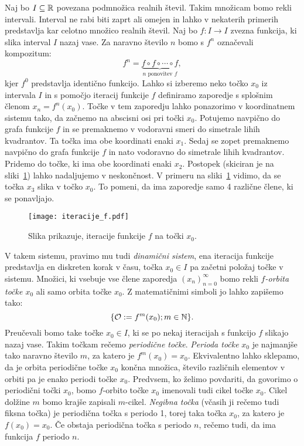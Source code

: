 \documentclass[../TG_magistrsko_delo_sections.tex]{subfiles}
\begin{document}
Naj bo $I\subseteq \mathbb R$ povezana podmnožica realnih števil. Takim množicam bomo rekli intervali. Interval ne rabi biti zaprt ali omejen in lahko v nekaterih primerih predstavlja kar celotno množico realnih števil. Naj bo $f:I \to I$ zvezna funkcija, ki slika interval $I$ nazaj vase. Za naravno število $n$ bomo s $f^n$ označevali kompozitum:
$$f^n = \underbrace{f \circ f \circ \cdots \circ f}_{n \text{ ponovitev } f},$$
kjer $f^0$ predstavlja identično funkcijo. Lahko si izberemo neko točko $x_0$ iz intervala $I$ in s pomočjo iteracij funkcije $f$ definiramo zaporedje s splošnim členom $x_n = f^n(x_0)$. Točke v tem zaporedju lahko ponazorimo v koordinatnem sistemu tako, da začnemo na abscisni osi pri točki $x_0$. Potujemo navpično do grafa funkcije $f$ in se premaknemo v vodoravni smeri do simetrale lihih kvadrantov. Ta točka ima obe koordinati enaki $x_1$. Sedaj se zopet premaknemo navpično do grafa funkcije $f$ in nato vodoravno do simetrale lihih kvadrantov. Pridemo do točke, ki ima obe koordinati enaki $x_2$. Postopek (skiciran je na sliki~\ref{fig:iteracije}) lahko nadaljujemo v neskončnost. V primeru na sliki~\ref{fig:iteracije} vidimo, da se točka $x_3$ slika v točko $x_0$. To pomeni, da ima zaporedje samo 4 različne člene, ki se ponavljajo.

\begin{figure}[h]
  \centering
  \texttt{[image: iteracije\_f.pdf]}
  \caption[Primer vektorske slike.]{Slika prikazuje, iteracije funkcije $f$ na točki $x_0$.}
  \label{fig:iteracije}
\end{figure}

V takem sistemu, pravimo mu tudi \emph{dinamični sistem}, ena iteracija funkcije predstavlja en diskreten korak v času, točka $x_0 \in I$ pa začetni položaj točke v sistemu. Množici, ki vsebuje vse člene zaporedja $\left( x_n \right)_{n=0}^{\infty}$ bomo rekli \emph{$f$-orbita točke $x_0$} ali samo orbita točke $x_0$. Z matematičnimi simboli jo lahko zapišemo tako:
$$\{ \mathcal{O} := f^m(x_0) ; m \in \mathbb N \}.$$
Preučevali bomo take točke $x_0 \in I$, ki se po nekaj iteracijah s funkcijo $f$ slikajo nazaj vase. Takim točkam rečemo \emph{periodične točke}. \emph{Perioda točke} $x_0$ je najmanjše tako naravno število $m$, za katero je $f^m(x_0) = x_0$. Ekvivalentno lahko sklepamo, da je orbita periodične točke $x_0$ končna množica, število različnih elementov v orbiti pa je enako periodi točke $x_0$. Predvsem, ko želimo povdariti, da govorimo o periodični točki $x_0$, bomo $f$-orbito točke $x_0$ imenovali tudi cikel točke $x_0$. Cikel dolžine $m$ bomo krajše zapisali $m$-cikel. \emph{Negibna točka} (včasih ji rečemo tudi fiksna točka) je periodična točka s periodo 1, torej taka točka $x_0$, za katero je $f(x_0) = x_0$. Če obstaja periodična točka s periodo $n$, rečemo tudi, da ima funkcija $f$ periodo $n$.
\end{document}
